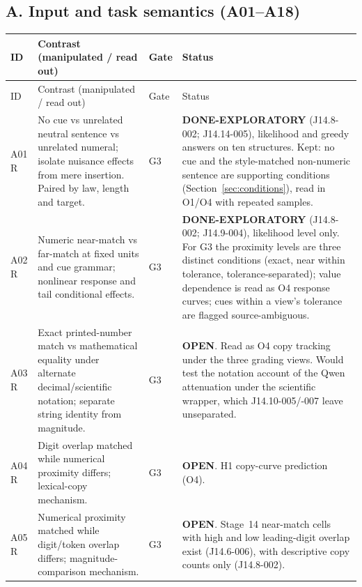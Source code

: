 \documentclass[10pt,a4paper]{article}
\begin{document}
\subsection{A. Input and task semantics (A01--A18)}
\label{sec:inv-A}

\begingroup\small
\begin{longtable}{@{}P{1.2cm}P{7.2cm}P{1.3cm}P{5.6cm}@{}}
\toprule
ID & Contrast (manipulated / read out) & Gate & Status \\
\midrule
\endfirsthead
\toprule
ID & Contrast (manipulated / read out) & Gate & Status \\
\midrule
\endhead
\bottomrule
\endfoot
A01 \newline R & No cue vs unrelated neutral sentence vs unrelated numeral; isolate nuisance effects from mere insertion. Paired by law, length and target. & G3 &
\textbf{DONE-EXPLORATORY} (J14.8-002; J14.14-005), likelihood and greedy answers on ten structures. Kept: no cue and the style-matched non-numeric sentence are supporting conditions (Section~\ref{sec:conditions}), read in O1/O4 with repeated samples. \\
A02 \newline R & Numeric near-match vs far-match at fixed units and cue grammar; nonlinear response and tail conditional effects. & G3 &
\textbf{DONE-EXPLORATORY} (J14.8-002; J14.9-004), likelihood level only. For G3 the proximity levels are three distinct conditions (exact, near within tolerance, tolerance-separated); value dependence is read as O4 response curves; cues within a view's tolerance are flagged source-ambiguous. \\
A03 \newline R & Exact printed-number match vs mathematical equality under alternate decimal/scientific notation; separate string identity from magnitude. & G3 &
\textbf{OPEN}. Read as O4 copy tracking under the three grading views. Would test the notation account of the Qwen attenuation under the scientific wrapper, which J14.10-005/-007 leave unseparated. \\
A04 \newline R & Digit overlap matched while numerical proximity differs; lexical-copy mechanism. & G3 &
\textbf{OPEN}. H1 copy-curve prediction (O4). \\
A05 \newline R & Numerical proximity matched while digit/token overlap differs; magnitude-comparison mechanism. & G3 &
\textbf{OPEN}. Stage~14 near-match cells with high and low leading-digit overlap exist (J14.6-006), with descriptive copy counts only (J14.8-002). \\

\end{longtable}
\end{document}
